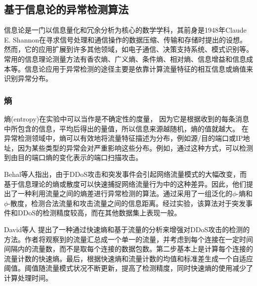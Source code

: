 

\subsection{基于信息论的异常检测算法}

信息论是一门以信息量化和冗余分析为核心的数学学科，其前身是1948年Claude E. Shannon在寻求信号处理和通信操作的数据压缩、传输和存储时提出的设想\cite{shannon1948mathematical}。然而，它的应用扩展到许多其他领域，如电子通信、决策支持系统、模式识别等。常用的信息理论测量方法有香农熵、广义熵、条件熵、相对熵、信息增益和信息成本等。信息论应用于异常检测的途径主要是依靠计算流量特征的相互信息或熵值来识别异常分布。

\subsubsection{熵}
熵(entropy)在实验中可以当作是不确定性的度量， 因为它是根据收到的每条消息中所包含的信息，平均后得出的量值，所以信息来源越随机，熵的值就越大。
在异常检测领域中，熵可以有效地将流量特征描述为分布，例如源/目的端口或IP地址，因为某些类型的异常会对严重影响这些分布。例如，通过这种方式，可以检测到由目的端口熵的变化表示的端口扫描攻击。

Behal等人\cite{behal2017detection}指出，由于DDoS攻击和突发事件会引起网络流量模式的大幅改变，而基于信息理论的熵或散度可以快速捕捉网络流量行为中的这种差异。因此，他们提出了一种利用流量之间的熵差进行异常检测的算法。通过采用了一组泛化的$\phi$-熵和$\phi$-散度，检测合法流量和攻击流量之间的信息距离。经过实验，该算法对于突发事件和DDoS的检测精度较高，而在其他数据集上表现一般。

David等人\cite{david2015ddos} 提出了一种通过快速熵和基于流量的分析来增强对DDoS攻击的检测的方法。作者将观察到的流量汇总成一个单一的流量，并考虑到每个连接在一定时间间隔内的流量数，而不是取每个连接的数据包数。第二步基本上是计算每个连接的流量计数的快速熵。最后，根据快速熵和流量计数的均值和标准差生成一个自适应阈值。阈值随流量模式状况不断更新，提高了检测精度，同时快速熵的使用减少了计算处理时间。


